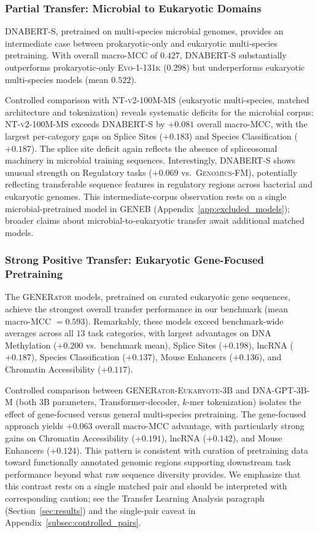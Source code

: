 \documentclass{llmxive}
\begin{document}
\subsubsection{Partial Transfer: Microbial to Eukaryotic Domains}

\textsc{DNABERT-S}, pretrained on multi-species microbial genomes,
provides an intermediate case between prokaryotic-only and
eukaryotic multi-species pretraining. With overall macro-MCC of
$0.427$, \textsc{DNABERT-S} substantially outperforms
prokaryotic-only \textsc{Evo-1-131k} ($0.298$) but underperforms
eukaryotic multi-species models (mean $0.522$).

Controlled comparison with \textsc{NT-v2-100M-MS} (eukaryotic
multi-species, matched architecture and tokenization) reveals
systematic deficits for the microbial corpus:
\textsc{NT-v2-100M-MS} exceeds \textsc{DNABERT-S} by $+0.081$
overall macro-MCC, with the largest per-category gaps on Splice
Sites ($+0.183$) and Species Classification ($+0.187$). The splice
site deficit again reflects the absence of spliceosomal machinery
in microbial training sequences. Interestingly, \textsc{DNABERT-S}
shows unusual strength on Regulatory tasks ($+0.069$ vs.\
\textsc{Genomics-FM}), potentially reflecting transferable sequence
features in regulatory regions across bacterial and eukaryotic
genomes. This intermediate-corpus observation rests on a single
microbial-pretrained model in GENEB
(Appendix~\ref{app:excluded_models}); broader claims about
microbial-to-eukaryotic transfer await additional matched models.

\subsubsection{Strong Positive Transfer: Eukaryotic Gene-Focused Pretraining}
The \textsc{GENERator} models, pretrained on curated eukaryotic
gene sequences, achieve the strongest overall transfer performance
in our benchmark (mean macro-MCC $= 0.593$). Remarkably, these
models exceed benchmark-wide averages across all $13$ task
categories, with largest advantages on DNA Methylation ($+0.200$
vs.\ benchmark mean), Splice Sites ($+0.198$), lncRNA ($+0.187$),
Species Classification ($+0.137$), Mouse Enhancers ($+0.136$),
and Chromatin Accessibility ($+0.117$).

Controlled comparison between \textsc{GENERator-Eukaryote-3B} and
\textsc{DNA-GPT-3B-M} (both 3B parameters, Transformer-decoder,
$k$-mer tokenization) isolates the effect of gene-focused versus
general multi-species pretraining. The gene-focused approach
yields $+0.063$ overall macro-MCC advantage, with particularly
strong gains on Chromatin Accessibility ($+0.191$), lncRNA
($+0.142$), and Mouse Enhancers ($+0.124$). This pattern is
consistent with curation of pretraining data toward functionally
annotated genomic regions supporting downstream task performance
beyond what raw sequence diversity provides. We emphasize that
this contrast rests on a single matched pair and should be
interpreted with corresponding caution; see the Transfer Learning
Analysis paragraph (Section~\ref{sec:results}) and the
single-pair caveat in Appendix~\ref{subsec:controlled_pairs}.
\end{document}
